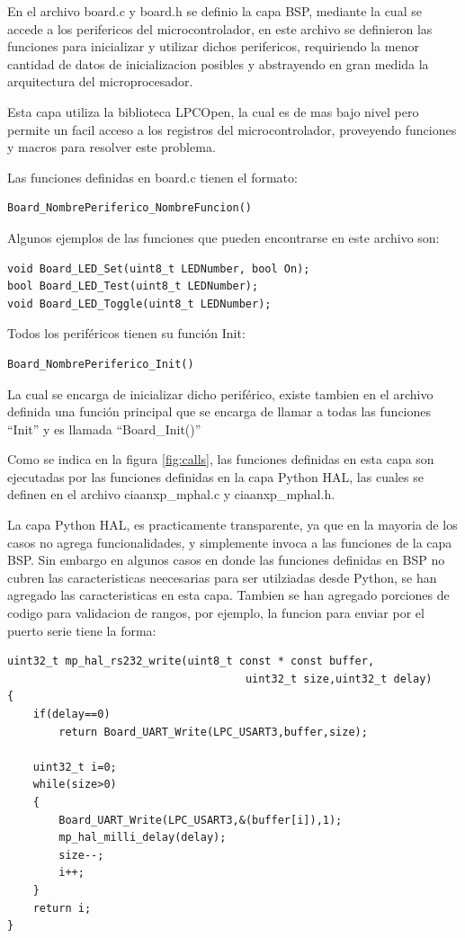 En el archivo board.c y board.h se definio la capa BSP, mediante la cual se accede a los perifericos del microcontrolador, en este archivo se definieron las funciones para inicializar y utilizar dichos perifericos, requiriendo la menor cantidad de datos de inicializacion posibles y abstrayendo en gran medida la arquitectura del microprocesador.

Esta capa utiliza la biblioteca LPCOpen, la cual es de mas bajo nivel pero permite un facil acceso a los registros del microcontrolador, proveyendo funciones y macros para resolver este problema.

Las funciones definidas en board.c tienen el formato:

\begin{verbatim}
Board_NombrePeriferico_NombreFuncion()
\end{verbatim}

Algunos ejemplos de las funciones que pueden encontrarse en este archivo son:

\begin{verbatim}
void Board_LED_Set(uint8_t LEDNumber, bool On);
bool Board_LED_Test(uint8_t LEDNumber);
void Board_LED_Toggle(uint8_t LEDNumber);
\end{verbatim}

Todos los periféricos tienen su función Init:
\begin{verbatim}
Board_NombrePeriferico_Init()
\end{verbatim}

La cual se encarga de inicializar dicho periférico, existe tambien en el archivo definida una función principal que se encarga de llamar a todas las funciones “Init” y es llamada “Board\_Init()”

Como se indica en la figura \ref{fig:calls}, las funciones definidas en esta capa son ejecutadas por las funciones definidas en la capa Python HAL, las cuales se definen en el archivo ciaanxp\_mphal.c y ciaanxp\_mphal.h.

La capa Python HAL, es practicamente transparente, ya que en la mayoria de los casos no agrega funcionalidades, y simplemente invoca a las funciones de la capa BSP. 
Sin embargo en algunos casos en donde las funciones definidas en BSP no cubren las caracteristicas neecesarias para ser utilziadas desde Python, se han agregado las caracteristicas en esta capa.
Tambien se han agregado porciones de codigo para validacion de rangos, por ejemplo, la funcion para enviar por el puerto serie tiene la forma:

\begin{lstlisting}[caption=Función de envío por la UART de la capa uPython HAL] 
uint32_t mp_hal_rs232_write(uint8_t const * const buffer, 
                                     uint32_t size,uint32_t delay)
{
    if(delay==0)
        return Board_UART_Write(LPC_USART3,buffer,size);

    uint32_t i=0;
    while(size>0)
    {
        Board_UART_Write(LPC_USART3,&(buffer[i]),1);
        mp_hal_milli_delay(delay);
        size--;
        i++;
    }
    return i;
}
\end{lstlisting}

